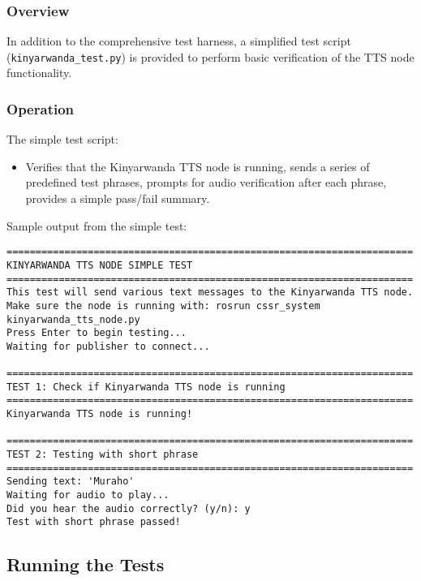 \documentclass{CSSRforAfrica}
\begin{document}
\subsubsection{Overview}
In addition to the comprehensive test harness, a simplified test script (\texttt{kinyarwanda\_test.py}) is provided to perform basic verification of the TTS node functionality.

\subsubsection{Operation}
The simple test script:
\begin{itemize}
    \item Verifies that the Kinyarwanda TTS node is running, sends a series of predefined test phrases, prompts for audio verification after each phrase, provides a simple pass/fail summary.
\end{itemize}

Sample output from the simple test:

\begin{lstlisting}[style=commandstyle]
======================================================================
KINYARWANDA TTS NODE SIMPLE TEST
======================================================================
This test will send various text messages to the Kinyarwanda TTS node.
Make sure the node is running with: rosrun cssr_system kinyarwanda_tts_node.py
Press Enter to begin testing...
Waiting for publisher to connect...

======================================================================
TEST 1: Check if Kinyarwanda TTS node is running
======================================================================
Kinyarwanda TTS node is running!

======================================================================
TEST 2: Testing with short phrase
======================================================================
Sending text: 'Muraho'
Waiting for audio to play...
Did you hear the audio correctly? (y/n): y
Test with short phrase passed!
\end{lstlisting}

\subsection{Running the Tests}
\end{document}

